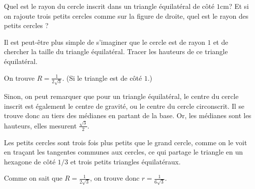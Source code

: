 

\begin{exo}
Quel est le rayon du cercle inscrit dans un triangle équilatéral de côté $1$cm?
Et si on rajoute trois petits cercles comme sur la figure de droite, quel est le rayon des petits cercles ?
\begin{center}
\hspace{1cm}
\end{center}
\begin{hint}
Il est peut-être plus simple de s'imaginer que le cercle est de rayon $1$ et de chercher la taille du triangle équilatéral.
Tracer les hauteurs de ce triangle équilatéral.
\end{hint}
\begin{sol}
On trouve $R=\frac{1}{2\sqrt 3}$. (Si le triangle est de côté $1$.)

Sinon, on peut remarquer que pour un triangle équilatéral, le centre du cercle inscrit est également le centre de gravité, ou le centre du cercle circonscrit. Il se trouve donc au tiers des médianes en partant de la base.
Or, les médianes sont les hauteurs, elles mesurent $\frac{\sqrt 3}{2}$.

Les petits cercles sont trois fois plus petits que le grand cercle, comme on le voit en traçant les tangentes communes aux cercles, ce qui partage le triangle en un hexagone de côté $1/3$ et trois petits triangles équilatéraux.

Comme on sait que $R=\frac{1}{2\sqrt 3}$, on trouve donc $r=\frac{1}{6\sqrt 3}$.
\end{sol}
\end{exo}






